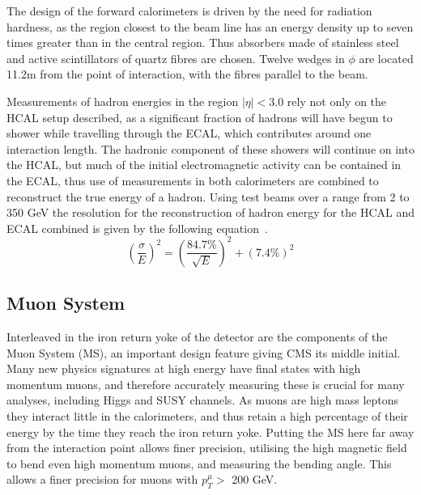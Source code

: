 The design of the forward calorimeters is driven by the need for radiation hardness, as the region closest to the beam line has an energy density up to seven times greater than in the central region. Thus absorbers made of stainless steel and active scintillators of quartz fibres are chosen. Twelve wedges in $\phi$ are located 11.2m from the point of interaction, with the fibres parallel to the beam.

Measurements of hadron energies in the region $| \eta| < 3.0$ rely not only on the HCAL setup described, as a significant fraction of hadrons will have begun to shower while travelling through the ECAL, which contributes around one interaction length.  The hadronic component of these showers will continue on into the HCAL, but much of the initial electromagnetic activity can be contained in the ECAL, thus use of measurements in both calorimeters are combined to reconstruct the true energy of a hadron. Using test beams over a range from 2 to 350 GeV the resolution for the reconstruction of hadron energy for the HCAL and ECAL combined is given by the following equation~\cite{HCALTestBeam}.
\begin{equation} 
\left(\frac{\sigma}{E}\right)^2 = \left(\frac{84.7\%}{\sqrt{E}}\right)^2 + \left(7.4\% \right)^2 
\label{eq:H-Res}
\end{equation}


\subsection{Muon System}

Interleaved in the iron return yoke of the detector are the components of the Muon System (MS), an important design feature giving CMS its middle initial. Many new physics signatures at high energy have final states with high momentum muons, and therefore accurately measuring these is crucial for many analyses, including Higgs and SUSY channels. As muons are high mass leptons they interact little in the calorimeters, and thus retain a high percentage of their energy by the time they reach the iron return yoke. Putting the MS here far away from the interaction point allows finer precision, utilising the high magnetic field to bend even high momentum muons, and measuring the bending angle. This allows a finer precision for muons with  $p^{\mu}_{T} > $ 200 GeV.


